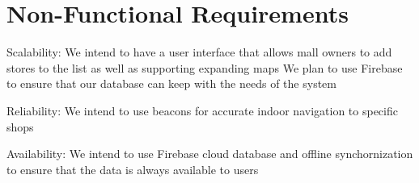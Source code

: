 \documentclass{article}
\begin{document}
\section{Non-Functional Requirements}

Scalability:
We intend to have a user interface that allows mall owners to add stores to the list as well as supporting expanding maps
We plan to use Firebase to ensure that our database can keep with the needs of the system \bigskip

Reliability:
We intend to use beacons for accurate indoor navigation to specific shops \bigskip

Availability:
We intend to use Firebase cloud database and offline synchornization to ensure that the data is always available to users
\end{document}
